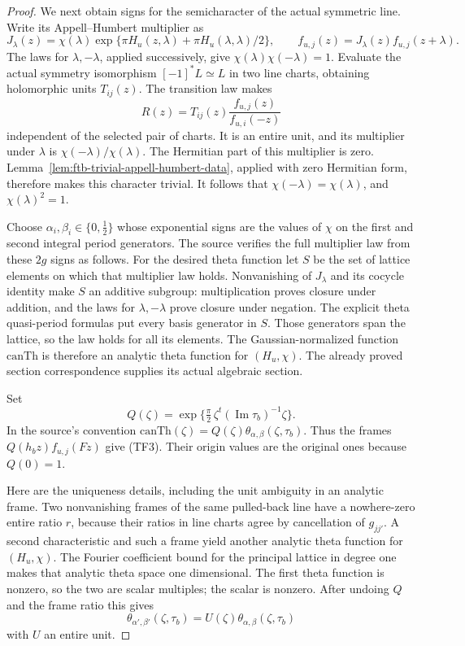 \begin{proof}
We next obtain signs for the semicharacter of the actual
symmetric line.  Write its Appell--Humbert multiplier as
\[
 J_\lambda(z)=\chi(\lambda)
    \exp\{\pi H_u(z,\lambda)+\pi H_u(\lambda,\lambda)/2\},
 \qquad f_{u,j}(z)=J_\lambda(z)f_{u,j}(z+\lambda).
\]
The laws for \(\lambda,-\lambda\), applied successively,
give \(\chi(\lambda)\chi(-\lambda)=1\).
Evaluate the actual symmetry isomorphism
\([-1]^*L\simeq L\) in two line charts, obtaining
holomorphic units \(T_{ij}(z)\).
The transition law makes
\[
             R(z)=T_{ij}(z)\frac{f_{u,j}(z)}{f_{u,i}(-z)}
\]
independent of the selected pair of charts.
It is an entire unit, and its multiplier under \(\lambda\)
is \(\chi(-\lambda)/\chi(\lambda)\).
The Hermitian part of this multiplier is zero.
Lemma~\ref{lem:ftb-trivial-appell-humbert-data}, applied with
zero Hermitian form, therefore makes this character trivial.
It follows that \(\chi(-\lambda)=\chi(\lambda)\), and
\(\chi(\lambda)^2=1\).

Choose \(\alpha_i,\beta_i\in\{0,\tfrac12\}\) whose exponential
signs are the values of \(\chi\) on the first and second
integral period generators.  The source verifies the full
multiplier law from these \(2g\) signs as follows.
For the desired theta function let \(S\) be the set of lattice
elements on which that multiplier law holds.
Nonvanishing of \(J_\lambda\) and its cocycle identity make
\(S\) an additive subgroup: multiplication proves closure
under addition, and the laws for \(\lambda,-\lambda\)
prove closure under negation.
The explicit theta quasi-period formulas put every basis
generator in \(S\).  Those generators span the lattice, so
the law holds for all its elements.
The Gaussian-normalized function \(\mathrm{canTh}\) is
therefore an analytic theta function for \((H_u,\chi)\).
The already proved section correspondence supplies its
actual algebraic section.

Set
\[
 Q(\zeta)=\exp\{\tfrac\pi2\,
                  \zeta^t(\operatorname{Im}\tau_b)^{-1}\zeta\}.
\]
In the source's convention
\(\mathrm{canTh}(\zeta)=Q(\zeta)
\theta_{\alpha,\beta}(\zeta,\tau_b)\).
Thus the frames
\(Q(h_bz)f_{u,j}(Fz)\) give (TF3).
Their origin values are the original ones because \(Q(0)=1\).

Here are the uniqueness details, including the unit ambiguity
in an analytic frame.
Two nonvanishing frames of the same pulled-back line have a
nowhere-zero entire ratio \(r\), because their ratios in line
charts agree by cancellation of \(g_{jj'}\).
A second characteristic and such a frame yield another
analytic theta function for \((H_u,\chi)\).
The Fourier coefficient bound for the principal lattice in
degree one makes that analytic theta space one dimensional.
The first theta function is nonzero, so the two are scalar
multiples; the scalar is nonzero.
After undoing \(Q\) and the frame ratio this gives
\[
 \theta_{\alpha',\beta'}(\zeta,\tau_b)
                   =U(\zeta)\theta_{\alpha,\beta}(\zeta,\tau_b)
                                                        \tag{TF5}
\]
with \(U\) an entire unit.


\end{proof}
